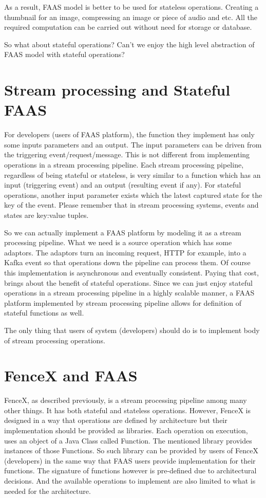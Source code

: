 \documentclass[a4]{report}
\begin{document}
    As a result, FAAS model is better to be used for stateless operations.
    Creating a thumbnail for an image, compressing an image or piece of audio and etc.
    All the required computation can be carried out without need for storage or database.

    So what about stateful operations?
    Can't we enjoy the high level abstraction of FAAS model with stateful operations?


    \section{Stream processing and Stateful FAAS}
    For developers (users of FAAS platform), the function they implement has only some inputs parameters and an output.
    The input parameters can be driven from the triggering event/request/message.
    This is not different from implementing operations in a stream processing pipeline.
    Each stream processing pipeline, regardless of being stateful or stateless, is very similar to a function which
    has an input (triggering event) and an output (resulting event if any).
    For stateful operations, another input parameter exists which the latest captured state for the key of the event.
    Please remember that in stream processing systems, events and states are key:value tuples.

    So we can actually implement a FAAS platform by modeling it as a stream processing pipeline.
    What we need is a source operation which has some adaptors.
    The adaptors turn an incoming request, HTTP for example, into a Kafka event so that operations down the pipeline
    can process them.
    Of course this implementation is asynchronous and eventually consistent.
    Paying that cost, brings about the benefit of stateful operations.
    Since we can just enjoy stateful operations in a stream processing pipeline in a highly scalable manner,
    a FAAS platform implemented by stream processing pipeline allows for definition of stateful functions as well.

    The only thing that users of system (developers) should do is to implement body of stream processing operations.


    \section{FenceX and FAAS}
    FenceX, as described previously, is a stream processing pipeline among many other things.
    It has both stateful and stateless operations.
    However, FenceX is designed in a way that operations are defined by architecture but their implementation should
    be provided as libraries.
    Each operation on execution, uses an object of a Java Class called Function.
    The mentioned library provides instances of those Functions.
    So such library can be provided by users of FenceX (developers) in the same way that FAAS users provide
    implementation for their functions.
    The signature of functions however is pre-defined due to architectural decisions.
    And the available operations to implement are also limited to what is needed for the architecture.
\end{document}
